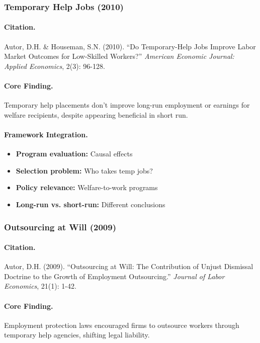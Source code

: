 \documentclass[12pt,a4paper]{article}
\begin{document}
\subsubsection{Temporary Help Jobs (2010)}

\paragraph{Citation.}
Autor, D.H. \& Houseman, S.N. (2010). ``Do Temporary-Help Jobs Improve
Labor Market Outcomes for Low-Skilled Workers?''
\emph{American Economic Journal: Applied Economics}, 2(3): 96-128.

\paragraph{Core Finding.}
Temporary help placements don't improve long-run employment or earnings
for welfare recipients, despite appearing beneficial in short run.

\paragraph{Framework Integration.}
\begin{itemize}
  \item \textbf{Program evaluation:} Causal effects
  \item \textbf{Selection problem:} Who takes temp jobs?
  \item \textbf{Policy relevance:} Welfare-to-work programs
  \item \textbf{Long-run vs. short-run:} Different conclusions
\end{itemize}

\subsubsection{Outsourcing at Will (2009)}

\paragraph{Citation.}
Autor, D.H. (2009). ``Outsourcing at Will: The Contribution of Unjust
Dismissal Doctrine to the Growth of Employment Outsourcing.''
\emph{Journal of Labor Economics}, 21(1): 1-42.

\paragraph{Core Finding.}
Employment protection laws encouraged firms to outsource workers through
temporary help agencies, shifting legal liability.
\end{document}
